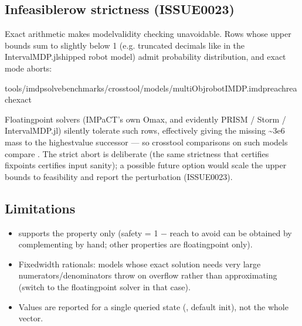 \documentclass[a4paper,10pt,english]{sphinxmanual}
\begin{document}
\subsection{Infeasible\sphinxhyphen{}row strictness (ISSUE\sphinxhyphen{}0023)}
\label{\detokenize{manual/exact:infeasible-row-strictness-issue-0023}}
\sphinxAtStartPar
Exact arithmetic makes model\sphinxhyphen{}validity checking unavoidable. Rows whose upper bounds
sum to slightly below 1 (e.g. truncated decimals like  in the
IntervalMDP.jl\sphinxhyphen{}shipped robot model) admit  probability distribution, and exact
mode aborts:

\begin{sphinxVerbatim}[commandchars=\\\{\}]
tools/imdp\PYGZus{}solvebenchmarks/crosstool/models/multiObj\PYGZus{}robotIMDP.imdpreachreach\PYGZhy{}\PYGZhy{}exact
\end{sphinxVerbatim}

\sphinxAtStartPar
Floating\sphinxhyphen{}point solvers (IMPaCT’s own O\sphinxhyphen{}max, and evidently PRISM / Storm /
IntervalMDP.jl) silently tolerate such rows, effectively giving the missing \textasciitilde{}3e\sphinxhyphen{}6 mass
to the highest\sphinxhyphen{}value successor — so cross\sphinxhyphen{}tool comparisons on such models compare
. The strict abort is deliberate (the same strictness that
certifies fixpoints certifies input sanity); a possible future  option
would scale the upper bounds to feasibility and report the perturbation (ISSUE\sphinxhyphen{}0023).


\subsection{Limitations}
\label{\detokenize{manual/exact:limitations}}\begin{itemize}
\item {} 
\sphinxAtStartPar
{} supports the  property only (safety = 1 − reach to avoid can be
obtained by complementing by hand; other properties are floating\sphinxhyphen{}point only).

\item {} 
\sphinxAtStartPar
Fixed\sphinxhyphen{}width rationals: models whose exact solution needs very large
numerators/denominators throw on overflow rather than approximating (switch to the
floating\sphinxhyphen{}point solver in that case).

\item {} 
\sphinxAtStartPar
Values are reported for a single queried state (, default init), not the
whole vector.

\end{itemize}
\end{document}
